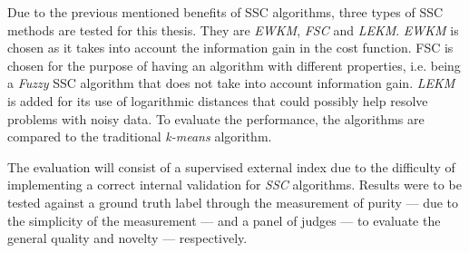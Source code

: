 \documentclass[../report.tex]{subfiles}
\begin{document}
Due to the previous mentioned benefits of SSC algorithms, three types of SSC methods are tested for this thesis. They are \textit{EWKM}, \textit{FSC} and \textit{LEKM}. \textit{EWKM} is chosen as it takes into account the information gain in the cost function. FSC is chosen for the purpose of having an algorithm with different properties, i.e. being a \textit{Fuzzy} SSC algorithm that does not take into account information gain. \textit{LEKM} is added for its use of logarithmic distances that could possibly help resolve problems with noisy data. To evaluate the performance, the algorithms are compared to the traditional \textit{k-means} algorithm.

The evaluation will consist of a supervised external index due to the difficulty of implementing a correct internal validation for \textit{SSC} algorithms. Results were to be tested against a ground truth label through the measurement of purity --- due to the simplicity of the measurement --- and a panel of judges --- to evaluate the general quality and novelty --- respectively.
\end{document}
